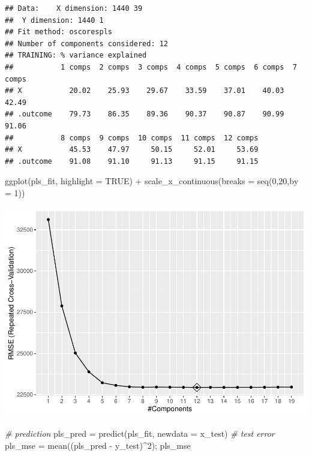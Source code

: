 \documentclass[
]{article}
\newenvironment{Shaded}{\begin{snugshade}}{\end{snugshade}}
\newcommand{\AttributeTok}[1]{\textcolor[rgb]{0.77,0.63,0.00}{#1}}
\newcommand{\CommentTok}[1]{\textcolor[rgb]{0.56,0.35,0.01}{\textit{#1}}}
\newcommand{\ConstantTok}[1]{\textcolor[rgb]{0.00,0.00,0.00}{#1}}
\newcommand{\DecValTok}[1]{\textcolor[rgb]{0.00,0.00,0.81}{#1}}
\newcommand{\FunctionTok}[1]{\textcolor[rgb]{0.00,0.00,0.00}{#1}}
\newcommand{\NormalTok}[1]{#1}
\newcommand{\OtherTok}[1]{\textcolor[rgb]{0.56,0.35,0.01}{#1}}
\newcommand{\SpecialCharTok}[1]{\textcolor[rgb]{0.00,0.00,0.00}{#1}}
\begin{document}
\begin{verbatim}
## Data:    X dimension: 1440 39 
##  Y dimension: 1440 1
## Fit method: oscorespls
## Number of components considered: 12
## TRAINING: % variance explained
##           1 comps  2 comps  3 comps  4 comps  5 comps  6 comps  7 comps
## X           20.02    25.93    29.67    33.59    37.01    40.03    42.49
## .outcome    79.73    86.35    89.36    90.37    90.87    90.99    91.06
##           8 comps  9 comps  10 comps  11 comps  12 comps
## X           45.53    47.97     50.15     52.01     53.69
## .outcome    91.08    91.10     91.13     91.15     91.15
\end{verbatim}

\begin{Shaded}
\begin{Highlighting}[]
\FunctionTok{ggplot}\NormalTok{(pls\_fit, }\AttributeTok{highlight =} \ConstantTok{TRUE}\NormalTok{) }\SpecialCharTok{+}  
\FunctionTok{scale\_x\_continuous}\NormalTok{(}\AttributeTok{breaks =} \FunctionTok{seq}\NormalTok{(}\DecValTok{0}\NormalTok{,}\DecValTok{20}\NormalTok{,}\AttributeTok{by =} \DecValTok{1}\NormalTok{))}
\end{Highlighting}
\end{Shaded}

\includegraphics{p8106_hw1_qz2266_final_files/figure-latex/unnamed-chunk-9-1.pdf}

\begin{Shaded}
\begin{Highlighting}[]
\CommentTok{\# prediction}
\NormalTok{pls\_pred }\OtherTok{=} \FunctionTok{predict}\NormalTok{(pls\_fit, }\AttributeTok{newdata =}\NormalTok{ x\_test)}
\CommentTok{\# test error}
\NormalTok{pls\_mse }\OtherTok{=} \FunctionTok{mean}\NormalTok{((pls\_pred }\SpecialCharTok{{-}}\NormalTok{ y\_test)}\SpecialCharTok{\^{}}\DecValTok{2}\NormalTok{); pls\_mse}
\end{Highlighting}
\end{Shaded}
\end{document}
